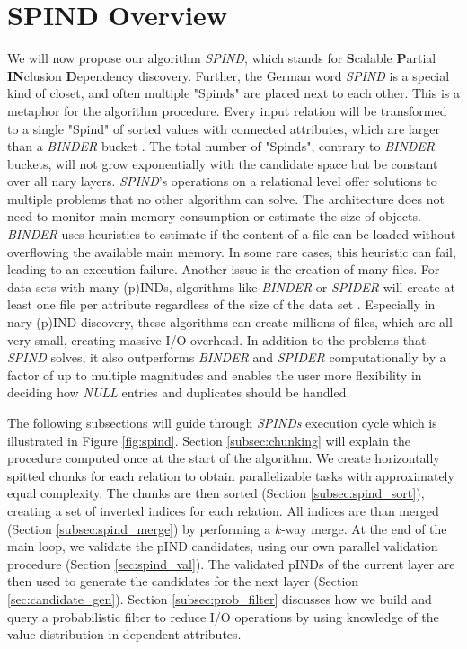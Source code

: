\section{SPIND Overview}\label{sec:spind}

We will now propose our algorithm \textit{SPIND}, which stands for \textbf{S}calable \textbf{P}artial \textbf{IN}clusion \textbf{D}ependency discovery. Further, the German word \textit{SPIND} is a special kind of closet, and often multiple "Spinds" are placed next to each other. This is a metaphor for the algorithm procedure. Every input relation will be transformed to a single "Spind" of sorted values with connected attributes, which are larger than a \textit{BINDER} bucket \cite{papenbrock2015divide}.  The total number of "Spinds", contrary to \textit{BINDER} buckets, will not grow exponentially with the candidate space but be constant over all nary layers. \textit{SPIND}'s operations on a relational level offer solutions to multiple problems that no other algorithm can solve. The architecture does not need to monitor main memory consumption or estimate the size of objects. \textit{BINDER} uses heuristics to estimate if the content of a file can be loaded without overflowing the available main memory. In some rare cases, this heuristic can fail, leading to an execution failure. Another issue is the creation of many files. For data sets with many (p)INDs, algorithms like \textit{BINDER} or \textit{SPIDER} will create at least one file per attribute regardless of the size of the data set \cite{papenbrock2015divide, bauckmann2006efficiently}. Especially in nary (p)IND discovery, these algorithms can create millions of files, which are all very small, creating massive I/O overhead. In addition to the problems that \textit{SPIND} solves, it also outperforms \textit{BINDER} and \textit{SPIDER} computationally by a factor of up to multiple magnitudes and enables the user more flexibility in deciding how \textit{NULL} entries and duplicates should be handled.

The following subsections will guide through \textit{SPINDs} execution cycle which is illustrated in Figure \ref{fig:spind}. Section \ref{subsec:chunking} will explain the procedure computed once at the start of the algorithm. We create horizontally spitted chunks for each relation to obtain parallelizable tasks with approximately equal complexity. The chunks are then sorted (Section \ref{subsec:spind_sort}), creating a set of inverted indices for each relation. All indices are than merged (Section \ref{subsec:spind_merge}) by performing a $k$-way merge. At the end of the main loop, we validate the pIND candidates, using our own parallel validation procedure (Section \ref{sec:spind_val}). The validated pINDs of the current layer are then used to generate the candidates for the next layer (Section \ref{sec:candidate_gen}). Section \ref{subsec:prob_filter} discusses how we build and query a probabilistic filter to reduce I/O operations by using knowledge of the value distribution in dependent attributes.

